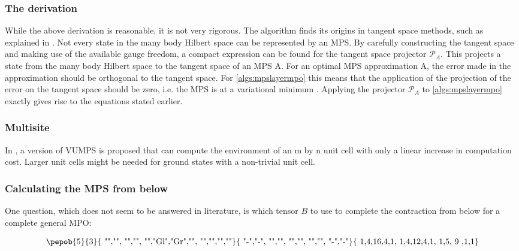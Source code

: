\subsubsection{The derivation}\label{vumps_Deriv}
While the above derivation is reasonable, it is not very rigorous. The algorithm finds its origins  in tangent space methods, such as explained in \cite{Vanderstraeten2019}. Not every state in the many body Hilbert space can be represented by an MPS. By carefully constructing the tangent space and making use of the available gauge freedom, a compact expression can be found for the tangent space projector $\mathcal{P}_A$. This projects a state from the many body Hilbert space to the tangent space of an MPS A. For an optimal MPS approximation A, the error made in the approximation should be orthogonal to the tangent space. For \cref{algs:mpslayermpo} this means that the application of the projection of the error on the tangent space should be zero, i.e. the MPS is at a variational minimum   \cite{Nietner2020}. Applying the projector $\mathcal{P}_A$ to \cref{algs:mpslayermpo} exactly gives rise to the equations stated earlier.

\subsubsection{Multisite}
In \cite{Nietner2020}, a version of VUMPS is proposed that can compute the environment of an m by n unit cell with only a linear increase in computation cost. Larger unit cells might be needed for ground states with a non-trivial unit cell.

\subsubsection{Calculating the MPS from below}\label{subsec:vumps_below_alt}

One question, which does not seem to be answered in literature, is which tensor $B$ to use to complete the contraction from below for a complete general MPO:

\begin{equation}
    \vcenter{ \hbox{   \pepob{5}{3}{{
                        "","", "","",
                        "","Gl","Gr","",
                        "","","",""}}{{
                        "-","-",
                        "","",
                        "","",
                        "","",
                        "-","-"}}{{
                        1,4,16,4,1,
                        1,4,12,4,1,
                        1,5, 9  ,1,1}} }}
\end{equation}

